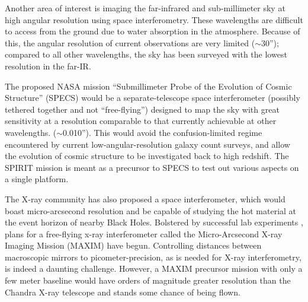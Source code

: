 \documentclass[12pt]{iopart}
\begin{document}
Another area of interest is imaging the far-infrared and
sub-millimeter sky at high angular resolution using space
interferometry.  These wavelengths are difficult to access from the
ground due to water absorption in the atmosphere.  Because of this,
the angular resolution of current observations are very limited
($\sim$30''); compared to all other wavelengths, the sky has been
surveyed with the lowest resolution in the far-IR.

The proposed NASA mission ``Submillimeter Probe of the Evolution of
Cosmic Structure'' (SPECS) would be a separate-telescope space
interferometer (possibly tethered together and not ``free-flying'')
designed to map the sky with great sensitivity at a resolution
comparable to that currently achievable at other wavelengths.
($\sim$0.010'').  This would avoid the confusion-limited regime
encountered by current low-angular-resolution galaxy count surveys,
and allow the evolution of cosmic structure to be investigated back to
high redshift.  The SPIRIT mission is meant as a precursor to SPECS to
test out various aspects on a single platform.

The X-ray community has also proposed a space interferometer, which
would boast micro-arcsecond resolution and be capable of studying the
hot material at the event horizon of nearby Black Holes.  Bolstered
by successful lab experiments \citep{cash2000}, plans for a
free-flying x-ray interferometer called the Micro-Arcsecond X-ray
Imaging Mission (MAXIM) have begun.  Controlling distances between
macroscopic mirrors to picometer-precision, as is needed for X-ray
interferometry, is indeed a daunting challenge. However, a MAXIM
precursor mission with only a few meter baseline would have orders of
magnitude greater resolution than the Chandra X-ray telescope and
stands some chance of being flown.
\end{document}
